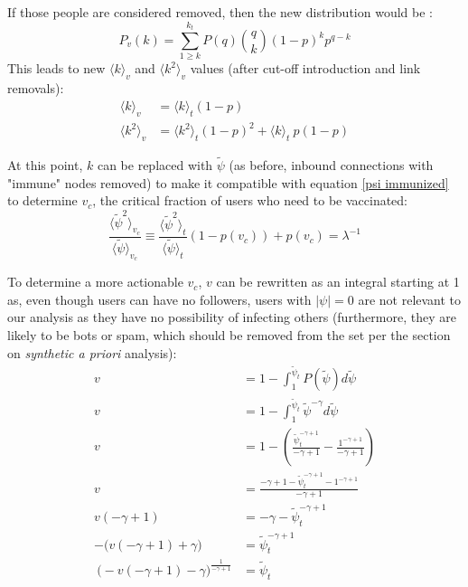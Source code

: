 \documentclass[preprint,review,12pt]{elsarticle}
\begin{document}
If those people are considered removed, then the new distribution would be \citep{cohen2001breakdown}:
\begin{equation}
    P_v(k) = \sum_{1\geq k}^{k_t}P(q)\binom{q}{k}(1-p)^kp^{q-k}
\end{equation}
This leads to new $\langle k \rangle_v$ and $\langle k^2 \rangle_v$ values (after cut-off introduction and link removals)\citep{pastor2002immunization}: 
\begin{align*}
        \langle k \rangle_v &= \langle k \rangle_t(1-p)\\
         \langle k^2 \rangle_v &= \langle k^2 \rangle_t(1-p)^2+\langle k \rangle_t\ p(1-p)
\end{align*}

At this point, $k$ can be replaced with $\tilde{\psi}$ (as before, inbound connections with "immune" nodes removed) to make it compatible with equation \ref{psi immunized} to determine $v_c$, the critical fraction of users who need to be vaccinated:
\begin{equation}
\label{v_c equation}
 \frac{\langle \tilde{\psi}^2 \rangle_{v_c}}{\langle \tilde{\psi} \rangle_{v_c}} \equiv \frac{\langle \tilde{\psi}^2 \rangle_{t}}{\langle \tilde{\psi} \rangle_{t}}(1-p(v_c))+p(v_c)=\lambda^{-1}
\end{equation}

To determine a more actionable $v_c$, $v$ can be rewritten as an integral starting at 1 as, even though users can have no followers, users with $|\psi| = 0$ are not relevant to our analysis as they have no possibility of infecting others (furthermore, they are likely to be bots or spam, which should be removed from the set per the section on \textit{synthetic a priori} analysis):
\begin{equation}
\begin{split}
    v & = 1 - \int_1^{\tilde{\psi}_{t}} P(\tilde{\psi})d\tilde{\psi} \\
   v & = 1 - \int_1^{\tilde{\psi}_{t}} \tilde{\psi}^{-\gamma}d\tilde{\psi} \\
   v & = 1 - \left(\frac{\tilde{\psi}_{t}^{-\gamma +1}}{-\gamma+1}-\frac{1^{-\gamma +1}}{-\gamma+1}\right) \\
   v & = \frac{-\gamma+1 - \tilde{\psi}_{t}^{-\gamma +1} -  1^{-\gamma +1}}{-\gamma+1} \\
   v(-\gamma + 1) & = -\gamma - \tilde{\psi}_{t}^{-\gamma +1}\\
   -\big(v(-\gamma + 1) + \gamma\big) & = \tilde{\psi}_{t}^{-\gamma+1}\\\
   \big(-v(-\gamma + 1) - \gamma\big)^{\frac{1}{-\gamma + 1}} & = \tilde{\psi}_t
\end{split}
\end{equation}
\end{document}
